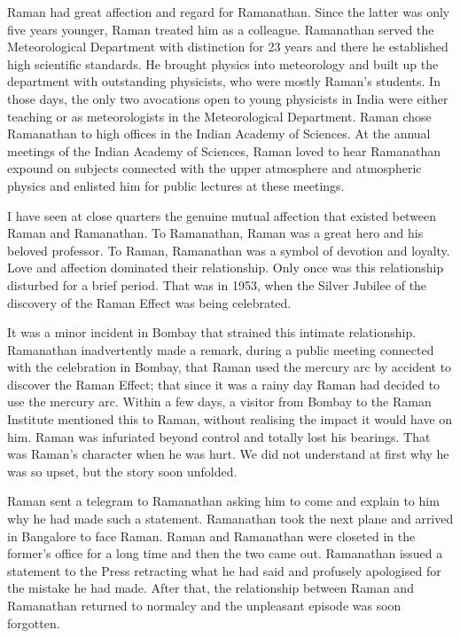 Raman had great affection and regard for Ramanathan. Since the latter was only five years younger, Raman treated him as a colleague. Ramanathan served the Meteorological Department with distinction for 23 years and there he established high scientific standards. He brought physics into meteorology and
built up the department with outstanding physicists, who were mostly Raman's students. In those days, the only two avocations open to young physicists in India were either teaching or as meteorologists in the Meteorological Department. Raman chose Ramanathan to high offices in the Indian Academy of Sciences.
At the annual meetings of the Indian Academy of Sciences, Raman loved to hear Ramanathan expound on subjects connected with the upper atmosphere and atmospheric physics and enlisted him for public lectures at these meetings.

I have seen at close quarters the genuine mutual affection that existed between Raman and Ramanathan. To Ramana\-than, Raman was a great hero and his beloved professor. To Raman, Ramanathan was a symbol of devotion and loyalty. Love and affection dominated their relationship. Only once was this relationship disturbed for a brief period. That was in 1953, when the Silver Jubilee of the discovery of the Raman Effect was being celebrated.

It was a minor incident in Bombay that strained this intimate relationship. Ramanathan inadvertently made a remark, during a public meeting connected with the celebration in Bombay, that Raman used the mercury arc by accident to discover the Raman Effect; that since it was a rainy day Raman had decided to use the mercury arc. Within a few days, a visitor from Bombay to the Raman Institute mentioned this to Raman, without realising the impact it would have on him. Raman was infuriated beyond control and totally lost his bearings. That was Raman's character when he was hurt. We did not understand at first why he was so upset, but the story soon unfolded.

Raman sent a telegram to Ramanathan asking him to come and explain to him why he had made such a statement. Ramanathan took the next plane and arrived in Bangalore to face Raman. Raman and Ramanathan were closeted in the former's office for a long time and then the two came out. Ramanathan issued a statement to the Press retracting what he had said and profusely apologised for the mistake he had made. After that, the relationship between Raman and Ramanathan returned to normalcy and the unpleasant episode was soon forgotten.

